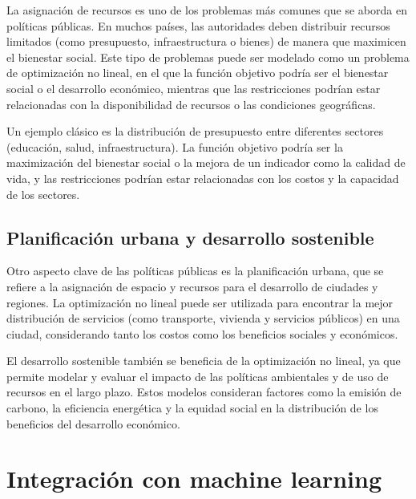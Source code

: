 \begin{flushleft}
	La asignación de recursos es uno de los problemas más comunes que se aborda en políticas públicas. En muchos países, las autoridades deben distribuir recursos limitados (como presupuesto, infraestructura o bienes) de manera que maximicen el bienestar social. Este tipo de problemas puede ser modelado como un problema de optimización no lineal, en el que la función objetivo podría ser el bienestar social o el desarrollo económico, mientras que las restricciones podrían estar relacionadas con la disponibilidad de recursos o las condiciones geográficas.
\end{flushleft}

\begin{flushleft}
	Un ejemplo clásico es la distribución de presupuesto entre diferentes sectores (educación, salud, infraestructura). La función objetivo podría ser la maximización del bienestar social o la mejora de un indicador como la calidad de vida, y las restricciones podrían estar relacionadas con los costos y la capacidad de los sectores.
\end{flushleft}

\subsection{Planificación urbana y desarrollo sostenible}

\begin{flushleft}
	Otro aspecto clave de las políticas públicas es la planificación urbana, que se refiere a la asignación de espacio y recursos para el desarrollo de ciudades y regiones. La optimización no lineal puede ser utilizada para encontrar la mejor distribución de servicios (como transporte, vivienda y servicios públicos) en una ciudad, considerando tanto los costos como los beneficios sociales y económicos.
\end{flushleft}

\begin{flushleft}
	El desarrollo sostenible también se beneficia de la optimización no lineal, ya que permite modelar y evaluar el impacto de las políticas ambientales y de uso de recursos en el largo plazo. Estos modelos consideran factores como la emisión de carbono, la eficiencia energética y la equidad social en la distribución de los beneficios del desarrollo económico.
\end{flushleft}

\section{Integración con machine learning}

